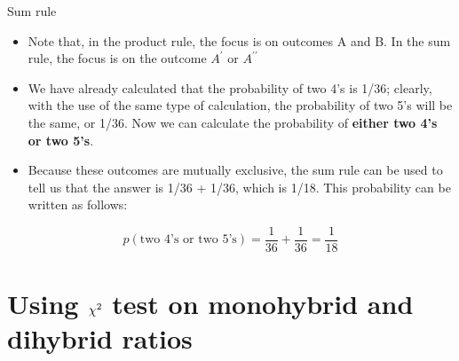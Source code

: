 \documentclass[11pt,ignorenonframetext,aspectratio=169]{beamer}
\providecommand{\tightlist}{%
  \setlength{\itemsep}{0pt}\setlength{\parskip}{0pt}}
\begin{document}
\begin{frame}{Sum rule}
\protect\hypertarget{sum-rule}{}
\begin{itemize}
\tightlist
\item
  Note that, in the product rule, the focus is on outcomes A and B. In
  the sum rule, the focus is on the outcome \(A^\prime\) or
  \(A^{\prime \prime}\)
\item
  We have already calculated that the probability of two 4's is 1/36;
  clearly, with the use of the same type of calculation, the probability
  of two 5's will be the same, or 1/36. Now we can calculate the
  probability of \textbf{either two 4's or two 5's}.
\item
  Because these outcomes are mutually exclusive, the sum rule can be
  used to tell us that the answer is 1/36 + 1/36, which is 1/18. This
  probability can be written as follows:
\end{itemize}

\[
p(\textrm{two 4's or two 5's}) = \frac{1}{36} + \frac{1}{36} = \frac{1}{18}
\]
\end{frame}

\hypertarget{using-large-chi2-test-on-monohybrid-and-dihybrid-ratios}{%
\section{\texorpdfstring{Using \(\Large \chi^2\) test on monohybrid and
dihybrid
ratios}{Using \textbackslash Large \textbackslash chi\^{}2 test on monohybrid and dihybrid ratios}}\label{using-large-chi2-test-on-monohybrid-and-dihybrid-ratios}}
\end{document}
